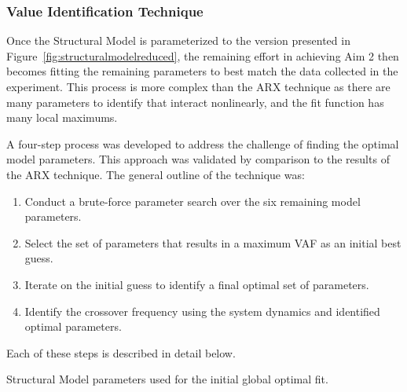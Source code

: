 \subsubsection{Value Identification Technique}
Once the Structural Model is parameterized to the version presented in Figure~\ref{fig:structuralmodelreduced}, the remaining effort in achieving Aim 2 then becomes fitting the remaining parameters to best match the data collected in the experiment.
This process is more complex than the ARX technique as there are many parameters to identify that interact nonlinearly, and the fit function has many local maximums.

A four-step process was developed to address the challenge of finding the optimal model parameters.
This approach was validated by comparison to the results of the ARX technique.
The general outline of the technique was:
\begin{enumerate}
    \item Conduct a brute-force parameter search over the six remaining model parameters.
    \item Select the set of parameters that results in a maximum VAF as an initial best guess.
    \item Iterate on the initial guess to identify a final optimal set of parameters.
    \item Identify the crossover frequency using the system dynamics and identified optimal parameters.
\end{enumerate}
Each of these steps is described in detail below.

\begin{table}[b]
    \centering
    \caption[Structural Model parameters used for the initial global optimal fit]{Structural Model parameters used for the initial global optimal fit.}
    \label{table:structuralmodelparameters}
\end{table}

